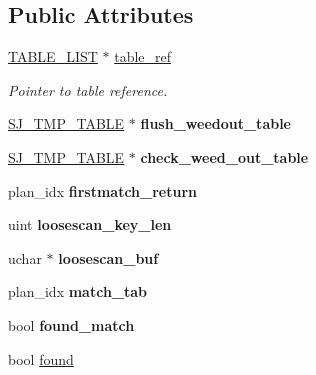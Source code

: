 \subsection*{Public Attributes}
\begin{DoxyCompactItemize}
\item 
\mbox{\label{classQEP__TAB_a49c4dc951dae1f964c12b441c9e1ca46}} 
\mbox{\hyperlink{structTABLE__LIST}{T\+A\+B\+L\+E\+\_\+\+L\+I\+ST}} $\ast$ \mbox{\hyperlink{classQEP__TAB_a49c4dc951dae1f964c12b441c9e1ca46}{table\+\_\+ref}}
\begin{DoxyCompactList}\small\item\em Pointer to table reference. \end{DoxyCompactList}\item 
\mbox{\label{classQEP__TAB_aacc5c629304d01effc4d555467a1be04}} 
\mbox{\hyperlink{classSJ__TMP__TABLE}{S\+J\+\_\+\+T\+M\+P\+\_\+\+T\+A\+B\+LE}} $\ast$ {\bfseries flush\+\_\+weedout\+\_\+table}
\item 
\mbox{\label{classQEP__TAB_acdfbf0cfaf74d8b31f954862d2ce5cd7}} 
\mbox{\hyperlink{classSJ__TMP__TABLE}{S\+J\+\_\+\+T\+M\+P\+\_\+\+T\+A\+B\+LE}} $\ast$ {\bfseries check\+\_\+weed\+\_\+out\+\_\+table}
\item 
\mbox{\label{classQEP__TAB_a6b58b417076dfe7060c312663a555aa8}} 
plan\+\_\+idx {\bfseries firstmatch\+\_\+return}
\item 
\mbox{\label{classQEP__TAB_a0ee104a6e674ca45053f24b2e0e05c0c}} 
uint {\bfseries loosescan\+\_\+key\+\_\+len}
\item 
\mbox{\label{classQEP__TAB_aeebb7b317b678998c1da65ab7b996036}} 
uchar $\ast$ {\bfseries loosescan\+\_\+buf}
\item 
\mbox{\label{classQEP__TAB_abcf96adc3625e96567934e144c5075c1}} 
plan\+\_\+idx {\bfseries match\+\_\+tab}
\item 
\mbox{\label{classQEP__TAB_a2294fb5a5485ddfe6395cc19d007b56e}} 
bool {\bfseries found\+\_\+match}
\item 
bool \mbox{\hyperlink{classQEP__TAB_ae3dd18c4599e6e7ce3ec0f3bde45aaed}{found}}

\end{DoxyCompactItemize}
